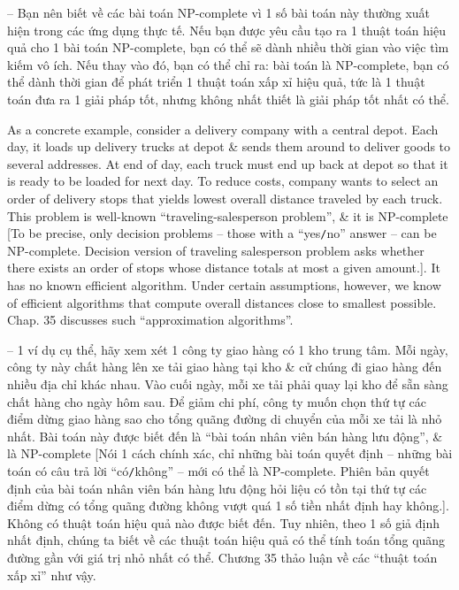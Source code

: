 \documentclass{article}
\begin{document}
\begin{itemize}
\begin{itemize}
\begin{itemize}
            -- Bạn nên biết về các bài toán NP-complete vì 1 số bài toán này thường xuất hiện trong các ứng dụng thực tế. Nếu bạn được yêu cầu tạo ra 1 thuật toán hiệu quả cho 1 bài toán NP-complete, bạn có thể sẽ dành nhiều thời gian vào việc tìm kiếm vô ích. Nếu thay vào đó, bạn có thể chỉ ra: bài toán là NP-complete, bạn có thể dành thời gian để phát triển 1 thuật toán xấp xỉ hiệu quả, tức là 1 thuật toán đưa ra 1 giải pháp tốt, nhưng không nhất thiết là giải pháp tốt nhất có thể.
            
            As a concrete example, consider a delivery company with a central depot. Each day, it loads up delivery trucks at depot \& sends them around to deliver goods to several addresses. At end of day, each truck must end up back at depot so that it is ready to be loaded for next day. To reduce costs, company wants to select an order of delivery stops that yields lowest overall distance traveled by each truck. This problem is well-known ``traveling-salesperson problem'', \& it is NP-complete [To be precise, only decision problems -- those with a ``yes{\tt/}no'' answer -- can be NP-complete. Decision version of traveling salesperson problem asks whether there exists an order of stops whose distance totals at most a given amount.]. It has no known efficient algorithm. Under certain assumptions, however, we know of efficient algorithms that compute overall distances close to smallest possible. Chap. 35 discusses such ``approximation algorithms''.
            
            -- 1 ví dụ cụ thể, hãy xem xét 1 công ty giao hàng có 1 kho trung tâm. Mỗi ngày, công ty này chất hàng lên xe tải giao hàng tại kho \& cử chúng đi giao hàng đến nhiều địa chỉ khác nhau. Vào cuối ngày, mỗi xe tải phải quay lại kho để sẵn sàng chất hàng cho ngày hôm sau. Để giảm chi phí, công ty muốn chọn thứ tự các điểm dừng giao hàng sao cho tổng quãng đường di chuyển của mỗi xe tải là nhỏ nhất. Bài toán này được biết đến là ``bài toán nhân viên bán hàng lưu động'', \& là NP-complete [Nói 1 cách chính xác, chỉ những bài toán quyết định -- những bài toán có câu trả lời ``có{\tt/}không'' -- mới có thể là NP-complete. Phiên bản quyết định của bài toán nhân viên bán hàng lưu động hỏi liệu có tồn tại thứ tự các điểm dừng có tổng quãng đường không vượt quá 1 số tiền nhất định hay không.]. Không có thuật toán hiệu quả nào được biết đến. Tuy nhiên, theo 1 số giả định nhất định, chúng ta biết về các thuật toán hiệu quả có thể tính toán tổng quãng đường gần với giá trị nhỏ nhất có thể. Chương 35 thảo luận về các ``thuật toán xấp xỉ'' như vậy.
            

\end{itemize}
\end{itemize}
\end{itemize}
\end{document}
